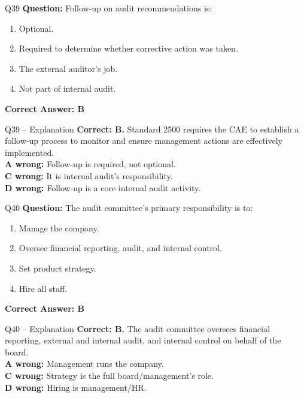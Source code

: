 \documentclass[aspectratio=169,10pt]{beamer}
\begin{document}
	\begin{frame}[t]{Q39}
		\small
		\textbf{Question:} Follow-up on audit recommendations is:
		\begin{enumerate}[label=\Alph*.,itemsep=1pt,topsep=2pt]
			\item Optional.
			\item Required to determine whether corrective action was taken.
			\item The external auditor's job.
			\item Not part of internal audit.
		\end{enumerate}
		\vspace{4pt}
		\textbf{Correct Answer: B}
	\end{frame}
	
	\begin{frame}[t]{Q39 -- Explanation}
		\small
		\textbf{Correct: B.} Standard 2500 requires the CAE to establish a follow-up process to monitor and ensure management actions are effectively implemented. \\[4pt]
		\textbf{A wrong:} Follow-up is required, not optional. \\[2pt]
		\textbf{C wrong:} It is internal audit's responsibility. \\[2pt]
		\textbf{D wrong:} Follow-up is a core internal audit activity.
	\end{frame}
	
	\begin{frame}[t]{Q40}
		\small
		\textbf{Question:} The audit committee's primary responsibility is to:
		\begin{enumerate}[label=\Alph*.,itemsep=1pt,topsep=2pt]
			\item Manage the company.
			\item Oversee financial reporting, audit, and internal control.
			\item Set product strategy.
			\item Hire all staff.
		\end{enumerate}
		\vspace{4pt}
		\textbf{Correct Answer: B}
	\end{frame}
	
	\begin{frame}[t]{Q40 -- Explanation}
		\small
		\textbf{Correct: B.} The audit committee oversees financial reporting, external and internal audit, and internal control on behalf of the board. \\[4pt]
		\textbf{A wrong:} Management runs the company. \\[2pt]
		\textbf{C wrong:} Strategy is the full board/management's role. \\[2pt]
		\textbf{D wrong:} Hiring is management/HR.
	\end{frame}
	
\end{document}
